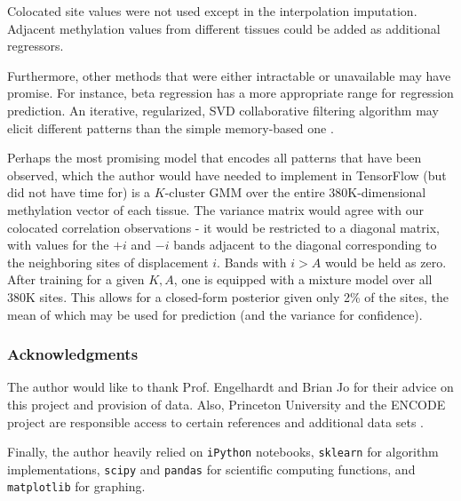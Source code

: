 \documentclass{article} %
\begin{document}
Colocated site values were not used except in the interpolation imputation. Adjacent methylation values from different tissues could be added as additional regressors.

Furthermore, other methods that were either intractable or unavailable may have promise. For instance, beta regression has a more appropriate range for regression prediction. An iterative, regularized, SVD collaborative filtering algorithm may elicit different patterns than the simple memory-based one \cite{percy}.

Perhaps the most promising model that encodes all patterns that have been observed, which the author would have needed to implement in TensorFlow (but did not have time for) is a $K$-cluster GMM over the entire 380K-dimensional methylation vector of each tissue. The variance matrix would agree with our colocated correlation observations - it would be restricted to a diagonal matrix, with values for the $+i$ and $-i$ bands adjacent to the diagonal corresponding to the neighboring sites of displacement $i$. Bands with $i> A$ would be held as zero. After training for a given $K,A$, one is equipped with a mixture model over all 380K sites. This allows for a closed-form posterior given only 2\% of the sites, the mean of which may be used for prediction (and the variance for confidence).


\subsubsection*{Acknowledgments}

The author would like to thank Prof. Engelhardt and Brian Jo for their advice on this project and provision of data. Also, Princeton University and the ENCODE project are responsible access to certain references and additional data sets \cite{encode2004encode}.

Finally, the author heavily relied on \texttt{iPython} \cite{iPython} notebooks, \texttt{sklearn} \cite{scikit-learn} for algorithm implementations, \texttt{scipy} \cite{scipy} and \texttt{pandas} \cite{pandas} for scientific computing functions, and \texttt{matplotlib} \cite{matplotlib} for graphing.




\end{document}
